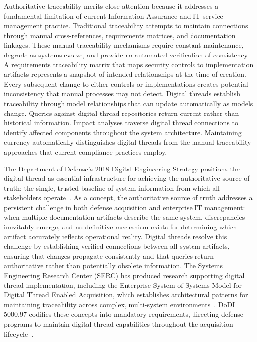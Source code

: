 Authoritative traceability merits close attention because it addresses a fundamental limitation of current Information Assurance and IT service management practice. Traditional traceability attempts to maintain connections through manual cross-references, requirements matrices, and documentation linkages. These manual traceability mechanisms require constant maintenance, degrade as systems evolve, and provide no automated verification of consistency. A requirements traceability matrix that maps security controls to implementation artifacts represents a snapshot of intended relationships at the time of creation. Every subsequent change to either controls or implementations creates potential inconsistency that manual processes may not detect. Digital threads establish traceability through model relationships that can update automatically as models change. Queries against digital thread repositories return current rather than historical information. Impact analyses traverse digital thread connections to identify affected components throughout the system architecture. Maintaining currency automatically distinguishes digital threads from the manual traceability approaches that current compliance practices employ.

The Department of Defense's 2018 Digital Engineering Strategy positions the digital thread as essential infrastructure for achieving the authoritative source of truth: the single, trusted baseline of system information from which all stakeholders operate~\parencite{DoD_DE_Strategy_2018}. As a concept, the authoritative source of truth addresses a persistent challenge in both defense acquisition and enterprise IT management: when multiple documentation artifacts describe the same system, discrepancies inevitably emerge, and no definitive mechanism exists for determining which artifact accurately reflects operational reality. Digital threads resolve this challenge by establishing verified connections between all system artifacts, ensuring that changes propagate consistently and that queries return authoritative rather than potentially obsolete information. The Systems Engineering Research Center (SERC) has produced research supporting digital thread implementation, including the Enterprise System-of-Systems Model for Digital Thread Enabled Acquisition, which establishes architectural patterns for maintaining traceability across complex, multi-system environments~\parencite{SERC_Digital_Thread_2018}. DoDI 5000.97 codifies these concepts into mandatory requirements, directing defense programs to maintain digital thread capabilities throughout the acquisition lifecycle~\parencite{DoDI_5000_97_2023}.

